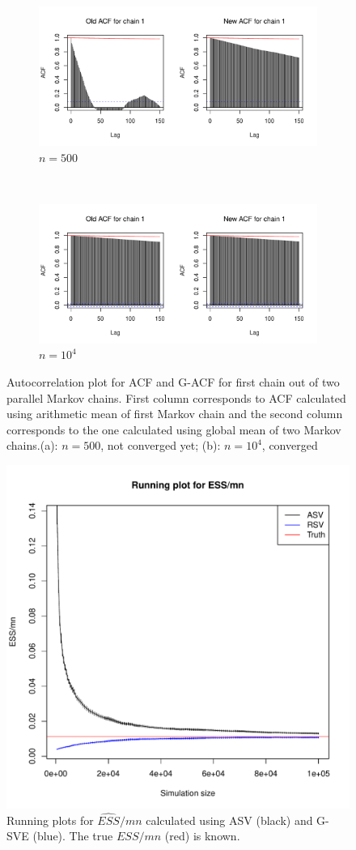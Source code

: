 \documentclass[11pt]{article}
\theoremstyle{remark}
\begin{document}
\begin{figure}
 \begin{subfigure}{\textwidth}
   \centering
   \includegraphics[width=.8\linewidth]{plots/acf,n=500.pdf}
   \caption{$n = 500$}
   \label{subfig:acf-500}
\end{subfigure}\\
\begin{subfigure}{\textwidth}
  \centering
  \includegraphics[width=.8\linewidth]{plots/acf,n=10000.pdf} 
  \caption{$n = 10^4$}
  \label{subfig:acf-5e4}
\end{subfigure}
\caption{Autocorrelation plot for ACF and G-ACF for first chain out of two parallel Markov chains. First column corresponds to ACF calculated using arithmetic mean of first Markov chain and the second column corresponds to the one calculated using global mean of two Markov chains.(a): $n = 500$, not converged yet; (b): $n =  10^4$, converged}
\label{fig:var-acf}
\end{figure}


\begin{figure}[h]
    \centering
    \includegraphics[width = .5\textwidth]{plots/var-ess.pdf}
    \caption{Running plots for $\hat{ESS}/mn$ calculated using ASV (black) and G-SVE (blue). The true $ESS/mn$ (red) is known.}
    \label{fig:var-ess}
\end{figure}
\end{document}
